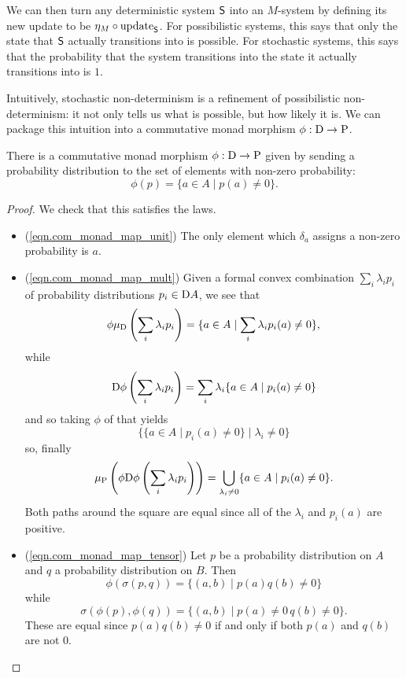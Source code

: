 \documentclass[DynamicalBook]{subfiles}
\begin{document}
We can then turn any deterministic system $\mathsf{S}$ into an $M$-system by
defining its new update to be $\eta_M \circ \mathrm{update}_{\mathsf{S}}$. For possibilistic
systems, this says that only the state that $\mathsf{S}$ actually transitions into
is possible. For stochastic systems, this says that the probability that the
system transitions into the state it actually transitions into is $1$.

Intuitively, stochastic non-determinism is a refinement of possibilistic
non-determinism: it not only tells us what is possible, but how likely it is. We
can package this intuition into a commutative monad morphism $\phi : \mathrm{D}
\to \mathrm{P}$.
\begin{proposition}\label{prop:com.monad.prob.to.poss}
  There is a commutative monad morphism $\phi : \mathrm{D} \to \mathrm{P}$ given by
  sending a probability distribution to the set of elements with non-zero probability:
  \[
\phi(p) = \{a \in A \mid p(a) \neq 0\}.
  \]
\end{proposition}
\begin{proof}
  We check that this satisfies the laws.
  \begin{itemize}
    \item (\cref{eqn.com_monad_map_unit}) The only element which $\delta_a$
      assigns a non-zero probability is $a$.
    \item (\cref{eqn.com_monad_map_mult}) Given a formal convex combination
      $\sum_i \lambda_i p_i$ of probability distributions $p_i \in \mathrm{D} A$,
      we see that
      \[
\phi\mu_{\mathrm{D}}\left( \sum_{i}\lambda_i p_i \right) = \{a \in A \mid \sum_i
\lambda_i p_i(a) \neq 0\},
      \]
      while
      \[
\mathrm{D}\phi\left( \sum_i \lambda_i p_i \right) = \sum_{i} \lambda_i \{a \in A
\mid p_i(a) \neq 0\}
\]
and so taking $\phi$ of that yields
\[
\{\{a \in A \mid p_i(a) \neq 0\} \mid \lambda_i \neq 0\}
\]
so, finally
\[
\mu_{\mathrm{P}}\left( \phi \mathrm{D} \phi\left( \sum_i \lambda_i p_i \right) \right)
= \bigcup_{\lambda_i \neq 0} \{a \in A \mid p_i(a) \neq 0\}.
\]
Both paths around the square are equal since all of the $\lambda_i$ and $p_i(a)$ are positive.
\item (\cref{eqn.com_monad_map_tensor}) Let $p$ be a probability distribution on
  $A$ and $q$ a probability distribution on $B$. Then
  \[
\phi(\sigma(p, q)) = \{(a, b) \mid p(a)q(b) \neq 0\}
\]
while
\[
\sigma(\phi(p), \phi(q)) = \{(a, b) \mid p(a) \neq 0\, q(b) \neq 0\}.
\]
These are equal since $p(a)q(b) \neq 0$ if and only if both $p(a)$ and $q(b)$
are not $0$.
  \end{itemize}
\end{proof}
\end{document}
